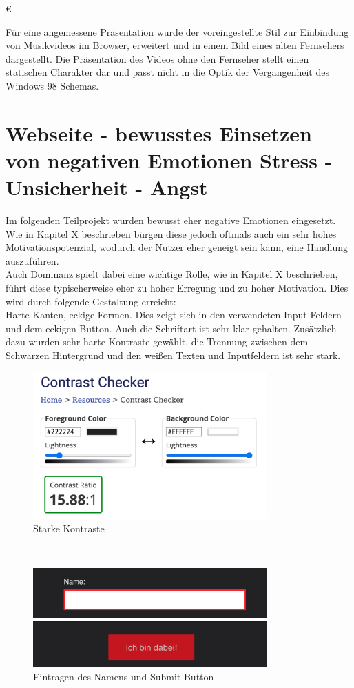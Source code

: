 €\documentclass[./dokumentation.tex]{subfiles}
\begin{document}
Für eine angemessene Präsentation wurde der voreingestellte Stil zur Einbindung von Musikvideos im Browser, erweitert und in einem Bild eines alten Fernsehers dargestellt. Die Präsentation des Videos ohne den Fernseher stellt einen statischen Charakter dar und passt nicht in die Optik der Vergangenheit des Windows 98 Schemas.


\pagebreak
\section{Webseite - bewusstes Einsetzen von negativen Emotionen Stress - Unsicherheit - Angst}
Im folgenden Teilprojekt wurden bewusst eher negative Emotionen eingesetzt. Wie in Kapitel X beschrieben bürgen diese jedoch oftmals auch ein sehr hohes Motivationspotenzial, wodurch der Nutzer eher geneigt sein kann, eine Handlung auszuführen.\\
Auch Dominanz spielt dabei eine wichtige Rolle, wie in Kapitel X beschrieben, führt diese typischerweise eher zu hoher Erregung und zu hoher Motivation. Dies wird durch folgende Gestaltung erreicht:\\
Harte Kanten, eckige Formen. Dies zeigt sich in den verwendeten Input-Feldern und dem eckigen Button. Auch die Schriftart ist sehr klar gehalten. Zusätzlich dazu wurden sehr harte Kontraste gewählt, die Trennung zwischen dem Schwarzen Hintergrund und den weißen Texten und Inputfeldern ist sehr stark.

\begin{figure}[H]
    \centering
    \includegraphics[width=0.8\textwidth]{bilder/contrast.png}
    \caption{Starke Kontraste} %
    \label{fig12:contrast}
\end{figure}\\

\begin{figure}[H]
    \centering
    \includegraphics[width=0.8\textwidth]{bilder/name-bin-dabei.png}
    \caption{Eintragen des Namens und Submit-Button} %
    \label{fig13:name}
\end{figure}\\
\end{document}
